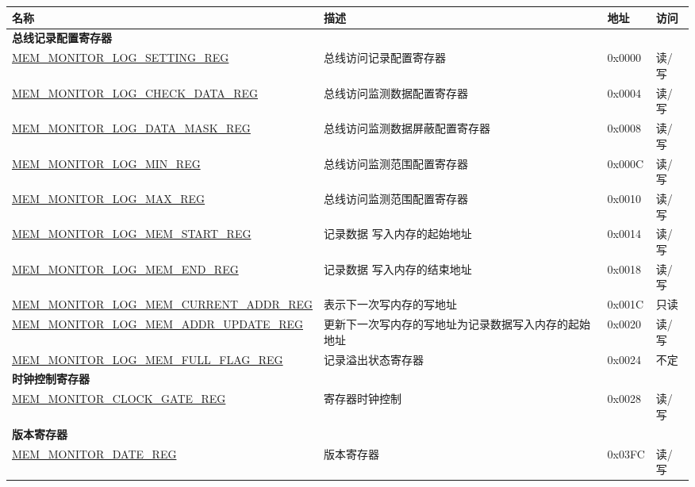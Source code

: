 \begin{longtable}{ | l| m{5cm} | l | l | }
\hline\rowcolor{lightgray}
{\bfseries 名称} & {\bfseries 描述} &  {\bfseries 地址} & {\bfseries 访问} \\ \hline
\endhead
\multicolumn{4}{|l|}{\textbf{总线记录配置寄存器}} \\ \hline
\hyperref[regdesc:MEMMONITORLOGSETTINGREG]{MEM\_MONITOR\_LOG\_SETTING\_REG} & 总线访问记录配置寄存器 & 0x0000 & 读/写 \\ \hline
\hyperref[regdesc:MEMMONITORLOGCHECKDATAREG]{MEM\_MONITOR\_LOG\_CHECK\_DATA\_REG} & 总线访问监测数据配置寄存器 & 0x0004 & 读/写 \\ \hline
\hyperref[regdesc:MEMMONITORLOGDATAMASKREG]{MEM\_MONITOR\_LOG\_DATA\_MASK\_REG} & 总线访问监测数据屏蔽配置寄存器 & 0x0008 & 读/写 \\ \hline
\hyperref[regdesc:MEMMONITORLOGMINREG]{MEM\_MONITOR\_LOG\_MIN\_REG} & 总线访问监测范围配置寄存器 & 0x000C & 读/写 \\ \hline
\hyperref[regdesc:MEMMONITORLOGMAXREG]{MEM\_MONITOR\_LOG\_MAX\_REG} & 总线访问监测范围配置寄存器 & 0x0010 & 读/写 \\ \hline
\hyperref[regdesc:MEMMONITORLOGMEMSTARTREG]{MEM\_MONITOR\_LOG\_MEM\_START\_REG} & 记录数据 写入内存的起始地址 & 0x0014 & 读/写 \\ \hline
\hyperref[regdesc:MEMMONITORLOGMEMENDREG]{MEM\_MONITOR\_LOG\_MEM\_END\_REG} & 记录数据 写入内存的结束地址 & 0x0018 & 读/写 \\ \hline
\hyperref[regdesc:MEMMONITORLOGMEMCURRENTADDRREG]{MEM\_MONITOR\_LOG\_MEM\_CURRENT\_ADDR\_REG} & 表示下一次写内存的写地址 & 0x001C & 只读 \\ \hline
\hyperref[regdesc:MEMMONITORLOGMEMADDRUPDATEREG]{MEM\_MONITOR\_LOG\_MEM\_ADDR\_UPDATE\_REG} & 更新下一次写内存的写地址为记录数据写入内存的起始地址 & 0x0020 & 读/写 \\ \hline
\hyperref[regdesc:MEMMONITORLOGMEMFULLFLAGREG]{MEM\_MONITOR\_LOG\_MEM\_FULL\_FLAG\_REG} & 记录溢出状态寄存器 & 0x0024 & 不定 \\ \hline
\multicolumn{4}{|l|}{\textbf{时钟控制寄存器}} \\ \hline
\hyperref[regdesc:MEMMONITORCLOCKGATEREG]{MEM\_MONITOR\_CLOCK\_GATE\_REG} & 寄存器时钟控制 & 0x0028 & 读/写 \\ \hline
\multicolumn{4}{|l|}{\textbf{版本寄存器}} \\ \hline
\hyperref[regdesc:MEMMONITORDATEREG]{MEM\_MONITOR\_DATE\_REG} & 版本寄存器 & 0x03FC & 读/写 \\ \hline
\end{longtable}
